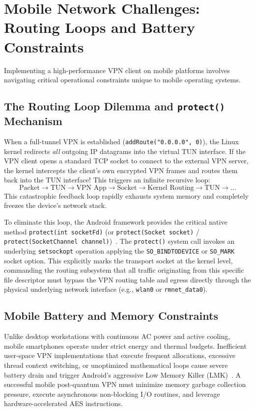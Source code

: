 \section{Mobile Network Challenges: Routing Loops and Battery Constraints}
\label{sec:mobile_network_challenges}

Implementing a high-performance VPN client on mobile platforms involves navigating critical operational constraints unique to mobile operating systems.

\subsection{The Routing Loop Dilemma and \texttt{protect()} Mechanism}
When a full-tunnel VPN is established (\texttt{addRoute("0.0.0.0", 0)}), the Linux kernel redirects \textit{all} outgoing IP datagrams into the virtual TUN interface. If the VPN client opens a standard TCP socket to connect to the external VPN server, the kernel intercepts the client's own encrypted VPN frames and routes them back into the TUN interface! This triggers an infinite recursive loop:
\begin{equation}
\text{Packet} \to \text{TUN} \to \text{VPN App} \to \text{Socket} \to \text{Kernel Routing} \to \text{TUN} \to \dots
\end{equation}
This catastrophic feedback loop rapidly exhausts system memory and completely freezes the device's network stack.

To eliminate this loop, the Android framework provides the critical native method \texttt{protect(int socketFd)} (or \texttt{protect(Socket socket)} / \texttt{protect(SocketChannel channel)})~\cite{android_vpnservice_docs}. The \texttt{protect()} system call invokes an underlying \texttt{setsockopt} operation applying the \texttt{SO\_BINDTODEVICE} or \texttt{SO\_MARK} socket option. This explicitly marks the transport socket at the kernel level, commanding the routing subsystem that all traffic originating from this specific file descriptor must bypass the VPN routing table and egress directly through the physical underlying network interface (e.g., \texttt{wlan0} or \texttt{rmnet\_data0}).

\subsection{Mobile Battery and Memory Constraints}
Unlike desktop workstations with continuous AC power and active cooling, mobile smartphones operate under strict energy and thermal budgets. Inefficient user-space VPN implementations that execute frequent allocations, excessive thread context switching, or unoptimized mathematical loops cause severe battery drain and trigger Android's aggressive Low Memory Killer (LMK)~\cite{mavroudis2017touchlog}. A successful mobile post-quantum VPN must minimize memory garbage collection pressure, execute asynchronous non-blocking I/O routines, and leverage hardware-accelerated AES instructions.

